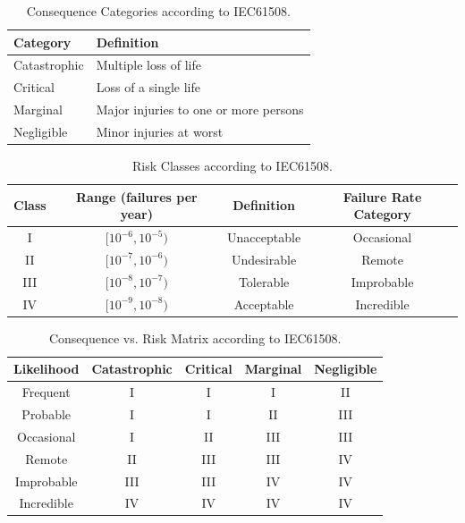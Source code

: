 \begin{table}[ht]
    \centering
    \caption{Consequence Categories according to IEC61508.}
    \begin{tabular}{ll}
        \toprule
        Category & Definition \\
        \midrule
        Catastrophic & Multiple loss of life \\
        Critical & Loss of a single life \\
        Marginal & Major injuries to one or more persons \\
        Negligible & Minor injuries at worst \\
        \bottomrule
    \end{tabular}
    \label{tab:consequence_categories}
\end{table}

\begin{table}[ht]
    \centering
    \caption{Risk Classes  according to IEC61508.}
    \begin{tabular}{cccc}
        \toprule
        Class &  Range (failures per year) &  Definition  &  Failure Rate Category \\
        \midrule
        I & $[10^{-6}, 10^{-5})$ & Unacceptable &  Occasional \\
        II  & $[10^{-7}, 10^{-6})$ & Undesirable &  Remote \\
        III  & $[10^{-8}, 10^{-7})$ & Tolerable &  Improbable \\
        IV  & $[10^{-9}, 10^{-8})$ &  Acceptable & Incredible \\
        \bottomrule
    \end{tabular}
    \label{tab:risk_classes}
\end{table}

\begin{table}[ht]
    \centering
    \caption{Consequence vs. Risk Matrix according to IEC61508.}
    \begin{tabular}{ccccc}
        \toprule
        Likelihood & Catastrophic & Critical & Marginal & Negligible \\
        \midrule
        Frequent & I & I & I & II \\
        Probable & I & I & II & III \\
        Occasional & I & II & III & III \\
        Remote & II & III & III & IV \\
        Improbable & III & III & IV & IV \\
        Incredible & IV & IV & IV & IV \\
        \bottomrule
    \end{tabular}
    \label{tab:consequence_risk}
\end{table}

